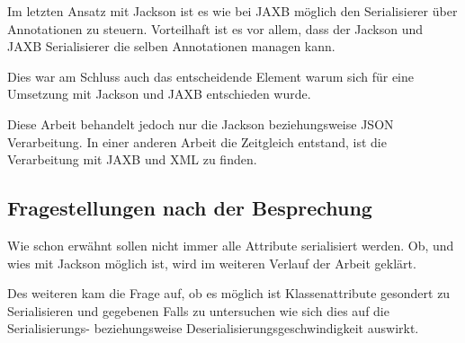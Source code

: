 Im letzten Ansatz mit Jackson ist es wie bei \ac{JAXB} m\"oglich den Serialisierer \"uber Annotationen zu steuern. Vorteilhaft ist es vor allem, dass der Jackson und \ac{JAXB} Serialisierer die selben Annotationen managen kann. 

Dies war am Schluss auch das entscheidende Element warum sich f\"ur eine Umsetzung mit Jackson und \ac{JAXB} entschieden wurde. 

Diese Arbeit behandelt jedoch nur die Jackson beziehungsweise \ac{JSON} Verarbeitung. In einer anderen Arbeit die Zeitgleich entstand, ist die Verarbeitung mit \ac{JAXB} und XML zu finden. \cite{Wal14} 

\subsection{Fragestellungen nach der Besprechung}
Wie schon erw\"ahnt sollen nicht immer alle Attribute serialisiert werden. Ob, und wies mit Jackson m\"oglich ist, wird im weiteren Verlauf der Arbeit gekl\"art. 

Des weiteren kam die Frage auf, ob es m\"oglich ist Klassenattribute gesondert zu Serialisieren und gegebenen Falls zu untersuchen wie sich dies auf die Serialisierungs- beziehungsweise Deserialisierungsgeschwindigkeit auswirkt.